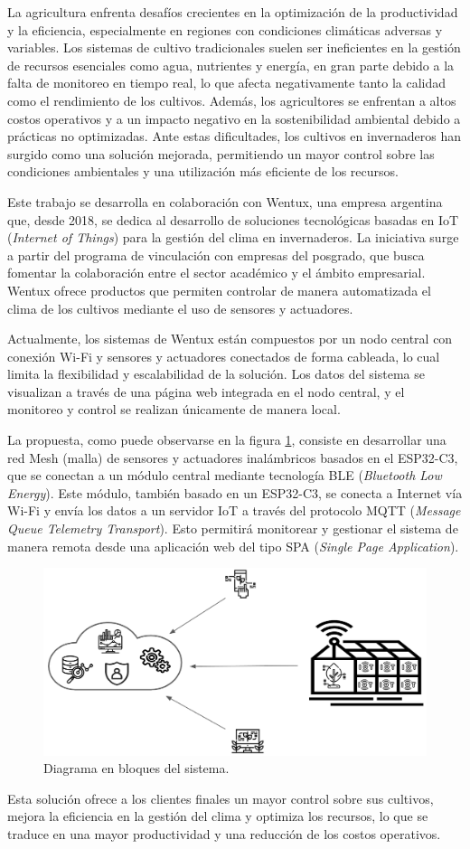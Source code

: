 La agricultura enfrenta desafíos crecientes en la optimización de la
productividad y la eficiencia, especialmente en regiones con condiciones
climáticas adversas y variables. Los sistemas de cultivo tradicionales suelen
ser ineficientes en la gestión de recursos esenciales como agua, nutrientes y
energía, en gran parte debido a la falta de monitoreo en tiempo real, lo que
afecta negativamente tanto la calidad como el rendimiento de los cultivos.
Además, los agricultores se enfrentan a altos costos operativos y a un impacto
negativo en la sostenibilidad ambiental debido a prácticas no optimizadas. Ante
estas dificultades, los cultivos en invernaderos han surgido como una solución
mejorada, permitiendo un mayor control sobre las condiciones ambientales y una
utilización más eficiente de los recursos.

Este trabajo se desarrolla en colaboración con Wentux, una empresa argentina
que, desde 2018, se dedica al desarrollo de soluciones tecnológicas basadas en
IoT (\textit{Internet of Things}) para la gestión del clima en invernaderos. La
iniciativa surge a partir del programa de vinculación con empresas del
posgrado, que busca fomentar la colaboración entre el sector académico y el
ámbito empresarial. Wentux ofrece productos que permiten controlar de manera
automatizada el clima de los cultivos mediante el uso de sensores y actuadores.

Actualmente, los sistemas de Wentux están compuestos por un nodo central con
conexión Wi-Fi y sensores y actuadores conectados de forma cableada, lo cual
limita la flexibilidad y escalabilidad de la solución. Los datos del sistema se
visualizan a través de una página web integrada en el nodo central, y el
monitoreo y control se realizan únicamente de manera local.

La propuesta, como puede observarse en la figura \ref{fig:diagBloques},
consiste en desarrollar una red Mesh (malla) de sensores y actuadores
inalámbricos basados en el ESP32-C3, que se conectan a un módulo central
mediante tecnología BLE (\textit{Bluetooth Low Energy}). Este módulo, también
basado en un ESP32-C3, se conecta a Internet vía Wi-Fi y envía los datos a un
servidor IoT a través del protocolo MQTT (\textit{Message Queue Telemetry
	Transport}). Esto permitirá monitorear y gestionar el sistema de manera remota
desde una aplicación web del tipo SPA (\textit{Single Page Application}).

\begin{figure}[htpb]
	\centering
	\includegraphics[width=.85\textwidth]{./Figuras/figura1.png}
	\caption{Diagrama en bloques del sistema.}
	\label{fig:diagBloques}
\end{figure}

Esta solución ofrece a los clientes finales un mayor control sobre sus
cultivos, mejora la eficiencia en la gestión del clima y optimiza los recursos,
lo que se traduce en una mayor productividad y una reducción de los costos
operativos.